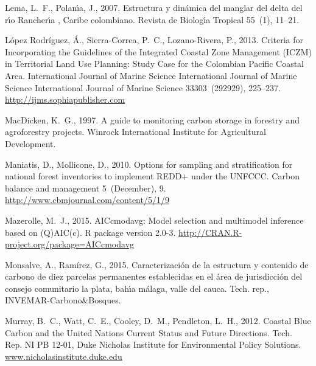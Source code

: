 \documentclass[review, authoryear]{elsarticle}   	%
\begin{document}
\begin{thebibliography}{51}
Lema, L.~F., Polan\'{\i}a, J., 2007. {Estructura y din\'{a}mica del manglar del
  delta del r\'{\i}o Rancher\'{\i}a , Caribe colombiano}. Revista de
  Biolog\'{\i}a Tropical 55~(1), 11--21.

{L{\'{o}}pez Rodr{\'{i}}guez}, {\'{A}}., Sierra-Correa, P.~C., Lozano-Rivera,
  P., 2013. {Criteria for Incorporating the Guidelines of the Integrated
  Coastal Zone Management (ICZM) in Territorial Land Use Planning: Study Case
  for the Colombian Pacific Coastal Area}. International Journal of Marine
  Science International Journal of Marine Science International Journal of
  Marine Science 33303~(292929), 225--237.
\newline\urlprefix\url{http://ijms.sophiapublisher.com}

MacDicken, K.~G., 1997. {A guide to monitoring carbon storage in forestry and
  agroforestry projects}. Winrock International Institute for Agricultural
  Development.

Maniatis, D., Mollicone, D., 2010. {Options for sampling and stratification for
  national forest inventories to implement REDD+ under the UNFCCC.} Carbon
  balance and management 5~(December), 9.
\newline\urlprefix\url{http://www.cbmjournal.com/content/5/1/9}

Mazerolle, M.~J., 2015. AICcmodavg: Model selection and multimodel inference
  based on (Q)AIC(c). R package version 2.0-3.
\newline\urlprefix\url{http://CRAN.R-project.org/package=AICcmodavg}

{Monsalve, A., Ram\'irez, G.}, 2015. Caracterizaci{\'o}n de la estructura y
  contenido de carbono de diez parcelas permanentes establecidas en el {\'a}rea
  de jurisdicci{\'o}n del consejo comunitario la plata, bah{\'\i}a m{\'a}laga,
  valle del cauca. Tech. rep., INVEMAR-Carbono\&Bosques.

Murray, B.~C., Watt, C.~E., Cooley, D.~M., Pendleton, L.~H., 2012. {Coastal
  Blue Carbon and the United Nations Current Status and Future Directions}.
  Tech. Rep. NI PB 12-01, Duke Nicholas Institute for Environmental Policy
  Solutions.
\newline\urlprefix\url{www.nicholasinstitute.duke.edu}


\end{thebibliography}
\end{document}
